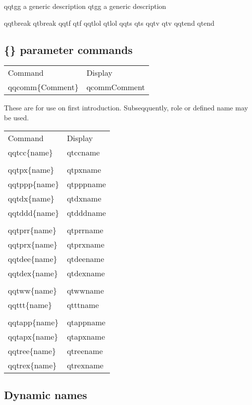 \documentclass{article}
\begin{document}
qqtgg a generic description qtgg a generic description

qqtbreak qtbreak
qqtf qtf
qqtlol qtlol
qqts qts
qqtv qtv
qqtend qtend

\newpage

\subsection{\{\} parameter commands}

\begin{tabular}{ll}
Command & Display \\
qqcomm\{Comment\} & qcomm{Comment} \\ 
\end{tabular}
\bigskip

\noindent These are for use on first introduction. Subseqquently, role or defined name may be used.\bigskip

\noindent\begin{tabular}{ll}
Command & Display \\
qqtcc\{name\} & qtcc{name} \\ 
\\
qqtpx\{name\} & qtpx{name} \\ 
qqtppp\{name\} & qtppp{name} \\ 
qqtdx\{name\} & qtdx{name} \\ 
qqtddd\{name\} & qtddd{name} \\ 
\\
qqtprr\{name\} & qtprr{name} \\ 
qqtprx\{name\} & qtprx{name} \\ 
qqtdee\{name\} & qtdee{name} \\ 
qqtdex\{name\} & qtdex{name} \\ 
\\
qqtww\{name\} & qtww{name} \\ 
qqttt\{name\} & qttt{name} \\ 
\\
qqtapp\{name\} & qtapp{name} \\ 
qqtapx\{name\} & qtapx{name} \\ 

qqtree\{name\} & qtree{name} \\ 
qqtrex\{name\} & qtrex{name} \\ 
\end{tabular}
\bigskip

\subsection{Dynamic names}
\end{document}
